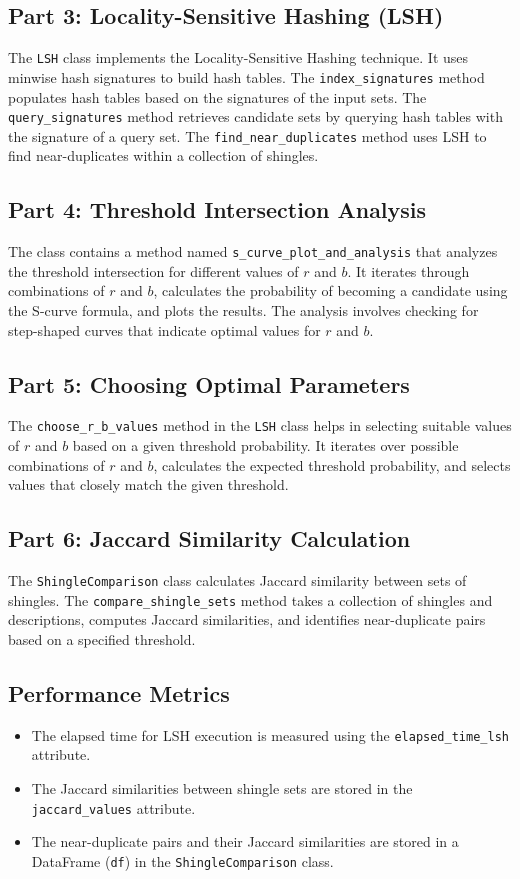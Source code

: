 	\subsection*{Part 3: Locality-Sensitive Hashing (LSH)}
	The \texttt{LSH} class implements the Locality-Sensitive Hashing technique. It uses minwise hash signatures to build hash tables. The \texttt{index\_signatures} method populates hash tables based on the signatures of the input sets. The \texttt{query\_signatures} method retrieves candidate sets by querying hash tables with the signature of a query set. The \texttt{find\_near\_duplicates} method uses LSH to find near-duplicates within a collection of shingles.
	
	\subsection*{Part 4: Threshold Intersection Analysis}
	The class contains a method named \texttt{s\_curve\_plot\_and\_analysis} that analyzes the threshold intersection for different values of $r$ and $b$. It iterates through combinations of $r$ and $b$, calculates the probability of becoming a candidate using the S-curve formula, and plots the results. The analysis involves checking for step-shaped curves that indicate optimal values for $r$ and $b$.
	
	\subsection*{Part 5: Choosing Optimal Parameters}
	The \texttt{choose\_r\_b\_values} method in the \texttt{LSH} class helps in selecting suitable values of $r$ and $b$ based on a given threshold probability. It iterates over possible combinations of $r$ and $b$, calculates the expected threshold probability, and selects values that closely match the given threshold.
	
	\subsection*{Part 6: Jaccard Similarity Calculation}
	The \texttt{ShingleComparison} class calculates Jaccard similarity between sets of shingles. The \texttt{compare\_shingle\_sets} method takes a collection of shingles and descriptions, computes Jaccard similarities, and identifies near-duplicate pairs based on a specified threshold.
	
	\subsection*{Performance Metrics}
	\begin{itemize}
	    \item The elapsed time for LSH execution is measured using the \texttt{elapsed\_time\_lsh} attribute.
	    \item The Jaccard similarities between shingle sets are stored in the \texttt{jaccard\_values} attribute.
	    \item The near-duplicate pairs and their Jaccard similarities are stored in a DataFrame (\texttt{df}) in the \texttt{ShingleComparison} class.
	\end{itemize}
	
